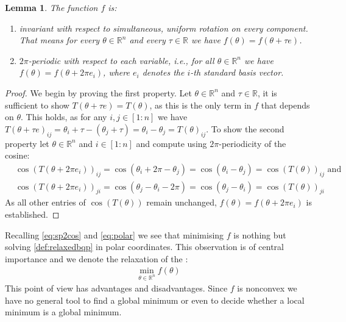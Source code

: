\documentclass[12pt,a4paper]{article}
\theoremstyle{mythm}
\newtheorem{lem}[thm]{Lemma}
\begin{document}
\begin{lem}
\label{prop:propertiesf} 
The function $ f $ is:
\begin{enumerate}
\item 
invariant with respect to simultaneous, uniform rotation on every component. That means for every $ \theta \in \mathbb{R} ^{ n }  $ and every  $ \tau \in \mathbb{R}  $ we have $ f (\theta) = f (\theta + \tau e) $.
\item $ 2 \pi  $-periodic with respect to each variable, i.e., for all $ \theta \in \mathbb{R} ^{ n }  $ we have $ f ( \theta ) = f ( \theta + 2 \pi e_i)  $, where $ e_i $
denotes the $ i $-th standard basis vector.
\end{enumerate}
\end{lem} 
\begin{proof}
We begin by proving the first property. Let $ \theta \in \mathbb{R} ^{ n }  $ and $ \tau \in \mathbb{R}  $, it is sufficient to show $ T ( \theta + \tau e) = T ( \theta) $,
as this is the only term in $ f $ that depends on $ \theta $.
This holds, as for any $ i,j \in \left[ 1:n \right]  $ we have $T ( \theta + \tau e) _{ ij } =  \theta _{ i } + \tau - ( \theta _{ j } + \tau ) = \theta _{ i } - \theta _{ j } = T(
\theta) _{ ij }  $.
To show the second property let $ \theta \in \mathbb{R} ^{ n }  $ and $ i \in \left[ 1:n \right]  $ and compute using $ 2 \pi  $-periodicity of the cosine:
\begin{align*}
&\cos(   T ( \theta + 2 \pi e_i) )_{ ij } =  \cos( \theta_i + 2 \pi - \theta_j ) = \cos( \theta_i - \theta_j ) = \cos( T (\theta) ) _{ ij } \text{ and} \\
&\cos(   T ( \theta + 2 \pi e_i) )_{ ji } =  \cos( \theta_j - \theta_i - 2 \pi ) = \cos( \theta_j - \theta_i ) = \cos( T (\theta) ) _{ ji }
\end{align*} 
As all other entries of $ \cos( T(\theta) )   $ remain unchanged, $ f(\theta) = f(\theta+2\pi e_i) $ is established.
\end{proof}
Recalling \ref{eq:sp2cos} and \ref{eq:polar} we see that minimising $ f $ is nothing but solving \ref{def:relaxedbqp} in polar coordinates.
This observation is of central importance and we denote the relaxation of the \MCP:
\begin{align}
\label{def:minf}
\min_{\theta \in \mathbb{R} ^{ n } } f(\theta)
\end{align} 
This point of view has advantages and disadvantages.
Since $ f $ is nonconvex we have no general tool to find a global minimum or even to decide whether a local minimum is a global minimum.
\end{document}

